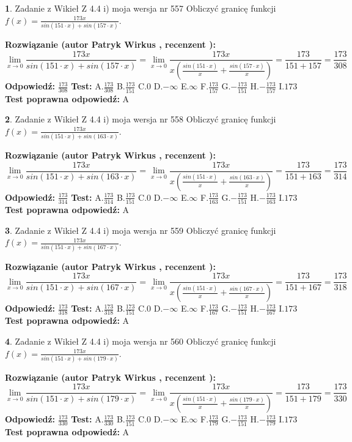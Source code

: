 \documentclass[12pt, a4paper]{article}
\theoremstyle{definition} %
\newtheorem{zad}{}
\newcommand{\zadStart}[1]{\begin{zad}#1\newline}
\newcommand{\zadStop}{\end{zad}}
\newcommand{\rozwStart}[2]{\noindent \textbf{Rozwiązanie (autor #1 , recenzent #2): }\newline}
\newcommand{\rozwStop}{\newline}
\newcommand{\odpStart}{\noindent \textbf{Odpowiedź:}\newline}
\newcommand{\odpStop}{\newline}
\newcommand{\testStart}{\noindent \textbf{Test:}\newline}
\newcommand{\testStop}{\newline}
\newcommand{\kluczStart}{\noindent \textbf{Test poprawna odpowiedź:}\newline}
\newcommand{\kluczStop}{\newline}
\begin{document}
\zadStart{Zadanie z Wikieł Z 4.4 i) moja wersja nr 557}
Obliczyć granicę funkcji $f(x)=\frac{173x}{sin(151\cdot x) +sin(157\cdot x)}$.
\zadStop
\rozwStart{Patryk Wirkus}{}
$$\lim\limits_{x\to 0}\frac{173x}{sin(151\cdot x) +sin(157\cdot x)}=\lim\limits_{x\to 0}\frac{173x}{x(\frac{sin(151\cdot x)}{x}+\frac{sin(157\cdot x)}{x})}=\frac{173}{151+157} = \frac{173}{308}$$
\rozwStop
\odpStart
$\frac{173}{308}$
\odpStop
\testStart
A.$\frac{173}{308}$
B.$\frac{173}{151}$
C.$0$
D.$-\infty$
E.$\infty$
F.$\frac{173}{157}$
G.$-\frac{173}{151}$
H.$-\frac{173}{157}$
I.$173$
\testStop
\kluczStart
A
\kluczStop



\zadStart{Zadanie z Wikieł Z 4.4 i) moja wersja nr 558}
Obliczyć granicę funkcji $f(x)=\frac{173x}{sin(151\cdot x) +sin(163\cdot x)}$.
\zadStop
\rozwStart{Patryk Wirkus}{}
$$\lim\limits_{x\to 0}\frac{173x}{sin(151\cdot x) +sin(163\cdot x)}=\lim\limits_{x\to 0}\frac{173x}{x(\frac{sin(151\cdot x)}{x}+\frac{sin(163\cdot x)}{x})}=\frac{173}{151+163} = \frac{173}{314}$$
\rozwStop
\odpStart
$\frac{173}{314}$
\odpStop
\testStart
A.$\frac{173}{314}$
B.$\frac{173}{151}$
C.$0$
D.$-\infty$
E.$\infty$
F.$\frac{173}{163}$
G.$-\frac{173}{151}$
H.$-\frac{173}{163}$
I.$173$
\testStop
\kluczStart
A
\kluczStop



\zadStart{Zadanie z Wikieł Z 4.4 i) moja wersja nr 559}
Obliczyć granicę funkcji $f(x)=\frac{173x}{sin(151\cdot x) +sin(167\cdot x)}$.
\zadStop
\rozwStart{Patryk Wirkus}{}
$$\lim\limits_{x\to 0}\frac{173x}{sin(151\cdot x) +sin(167\cdot x)}=\lim\limits_{x\to 0}\frac{173x}{x(\frac{sin(151\cdot x)}{x}+\frac{sin(167\cdot x)}{x})}=\frac{173}{151+167} = \frac{173}{318}$$
\rozwStop
\odpStart
$\frac{173}{318}$
\odpStop
\testStart
A.$\frac{173}{318}$
B.$\frac{173}{151}$
C.$0$
D.$-\infty$
E.$\infty$
F.$\frac{173}{167}$
G.$-\frac{173}{151}$
H.$-\frac{173}{167}$
I.$173$
\testStop
\kluczStart
A
\kluczStop



\zadStart{Zadanie z Wikieł Z 4.4 i) moja wersja nr 560}
Obliczyć granicę funkcji $f(x)=\frac{173x}{sin(151\cdot x) +sin(179\cdot x)}$.
\zadStop
\rozwStart{Patryk Wirkus}{}
$$\lim\limits_{x\to 0}\frac{173x}{sin(151\cdot x) +sin(179\cdot x)}=\lim\limits_{x\to 0}\frac{173x}{x(\frac{sin(151\cdot x)}{x}+\frac{sin(179\cdot x)}{x})}=\frac{173}{151+179} = \frac{173}{330}$$
\rozwStop
\odpStart
$\frac{173}{330}$
\odpStop
\testStart
A.$\frac{173}{330}$
B.$\frac{173}{151}$
C.$0$
D.$-\infty$
E.$\infty$
F.$\frac{173}{179}$
G.$-\frac{173}{151}$
H.$-\frac{173}{179}$
I.$173$
\testStop
\kluczStart
A
\kluczStop
\end{document}
